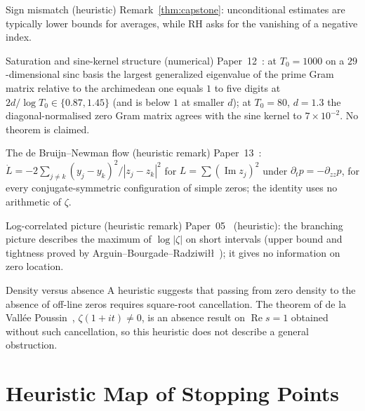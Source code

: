 \documentclass[11pt]{amsart}
\theoremstyle{definition}
\theoremstyle{remark}
\renewcommand{\Re}{\operatorname{Re}}
\renewcommand{\Im}{\operatorname{Im}}
\begin{document}
\begin{nogobox}{Sign mismatch (heuristic)}
Remark~\ref{thm:capstone}: unconditional estimates are typically lower bounds for
averages, while RH asks for the vanishing of a negative index.
\end{nogobox}

\begin{nogobox}{Saturation and sine-kernel structure (numerical)}
Paper~12~\cite[Obs.~3.1, 4.1]{P12}: at $T_0=1000$ on a $29$-dimensional sinc basis the
largest generalized eigenvalue of the prime Gram matrix relative to the archimedean one
equals $1$ to five digits at $2d/\log T_0\in\{0.87,1.45\}$ (and is below $1$ at smaller
$d$); at $T_0=80$, $d=1.3$ the diagonal-normalised zero Gram matrix agrees with the sine
kernel to $7\times10^{-2}$. No theorem is claimed.
\end{nogobox}

\begin{nogobox}{The de Bruijn--Newman flow (heuristic remark)}
Paper~13~\cite[Thm.~2.1, Rem.~3.1]{P13}: $\dot L=-2\sum_{j\ne k}(y_j-y_k)^2/|z_j-z_k|^2$ for
$L=\sum(\Im z_j)^2$ under $\partial_tp=-\partial_{zz}p$, for every conjugate-symmetric
configuration of simple zeros; the identity uses no arithmetic of $\zeta$.
\end{nogobox}

\begin{nogobox}{Log-correlated picture (heuristic remark)}
Paper~05~\cite[Sections~6 and~7]{P05} (heuristic): the branching picture describes the maximum of
$\log|\zeta|$ on short intervals (upper bound and tightness proved by
Arguin--Bourgade--Radziwi{\l}{\l}~\cite{ABR20,ABR23}); it gives no information on zero location.
\end{nogobox}

\begin{nogobox}{Density versus absence}
A heuristic suggests that passing from zero density to the absence of off-line zeros
requires square-root cancellation. The theorem of de la Vall\'ee Poussin~\cite{dlVP96},
$\zeta(1+it)\ne0$, is an absence result on $\Re s=1$ obtained without such cancellation,
so this heuristic does not describe a general obstruction.
\end{nogobox}

\section{Heuristic Map of Stopping Points}
\label{sec:walls}
\end{document}
